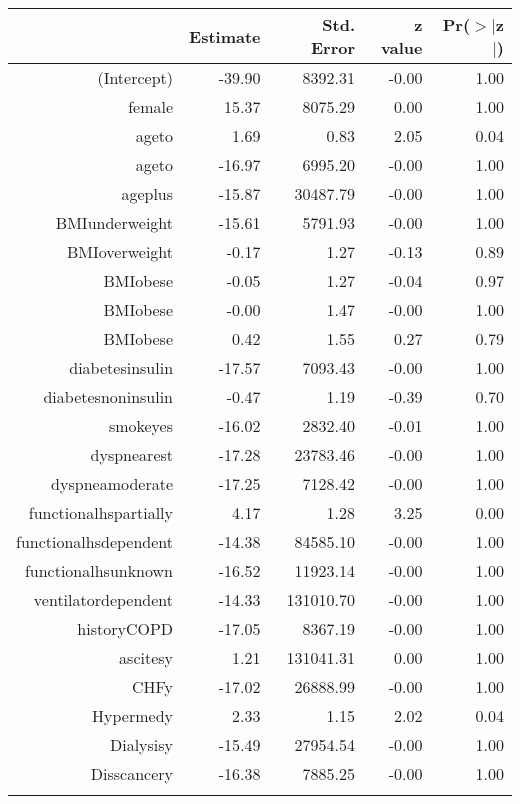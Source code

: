 \bigskip\bigskip
\centering
\begin{tabular}{rrrrr}
  \hline
 & Estimate & Std. Error & z value & Pr($>$$|$z$|$) \\ 
  \hline
(Intercept) & -39.90 & 8392.31 & -0.00 & 1.00 \\ 
  female & 15.37 & 8075.29 & 0.00 & 1.00 \\ 
  age\-65\-to\-74 & 1.69 & 0.83 & 2.05 & 0.04 \\ 
  age\-75\-to\-84 & -16.97 & 6995.20 & -0.00 & 1.00 \\ 
  age\-85\-plus & -15.87 & 30487.79 & -0.00 & 1.00 \\ 
  BMI\-underweight & -15.61 & 5791.93 & -0.00 & 1.00 \\ 
  BMI\-overweight & -0.17 & 1.27 & -0.13 & 0.89 \\ 
  BMI\-obese\-1 & -0.05 & 1.27 & -0.04 & 0.97 \\ 
  BMI\-obese\-2 & -0.00 & 1.47 & -0.00 & 1.00 \\ 
  BMI\-obese\-3 & 0.42 & 1.55 & 0.27 & 0.79 \\ 
  diabetes\-insulin & -17.57 & 7093.43 & -0.00 & 1.00 \\ 
  diabetes\-noninsulin & -0.47 & 1.19 & -0.39 & 0.70 \\ 
  smoke\-yes & -16.02 & 2832.40 & -0.01 & 1.00 \\ 
  dyspnea\-rest & -17.28 & 23783.46 & -0.00 & 1.00 \\ 
  dyspnea\-moderate & -17.25 & 7128.42 & -0.00 & 1.00 \\ 
  functional\-hs\-partially & 4.17 & 1.28 & 3.25 & 0.00 \\ 
  functional\-hs\-dependent & -14.38 & 84585.10 & -0.00 & 1.00 \\ 
  functional\-hs\-unknown & -16.52 & 11923.14 & -0.00 & 1.00 \\ 
  ventilator\-dependent & -14.33 & 131010.70 & -0.00 & 1.00 \\ 
  history\-COPD & -17.05 & 8367.19 & -0.00 & 1.00 \\ 
  ascites\-y & 1.21 & 131041.31 & 0.00 & 1.00 \\ 
  CHF\-y & -17.02 & 26888.99 & -0.00 & 1.00 \\ 
  Hyper\-med\-y & 2.33 & 1.15 & 2.02 & 0.04 \\ 
  Dialysis\-y & -15.49 & 27954.54 & -0.00 & 1.00 \\ 
  Diss\-cancer\-y & -16.38 & 7885.25 & -0.00 & 1.00 \\ 
$$
\end{tabular}
